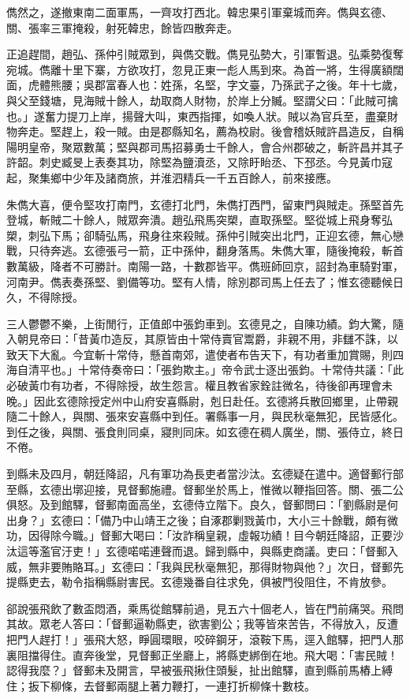 儁然之，遂撤東南二面軍馬，一齊攻打西北。韓忠果引軍棄城而奔。儁與玄德、關、張率三軍掩殺，射死韓忠，餘皆四散奔走。

正追趕間，趙弘、孫仲引賊眾到，與儁交戰。儁見弘勢大，引軍暫退。弘乘勢復奪宛城。儁離十里下寨，方欲攻打，忽見正東一彪人馬到來。為首一將，生得廣額闊面，虎體熊腰；吳郡富春人也：姓孫，名堅，字文臺，乃孫武子之後。年十七歲，與父至錢塘，見海賊十餘人，劫取商人財物，於岸上分贓。堅謂父曰：「此賊可擒也。」遂奮力提刀上岸，揚聲大叫，東西指揮，如喚人狀。賊以為官兵至，盡棄財物奔走。堅趕上，殺一賊。由是郡縣知名，薦為校尉。後會稽妖賊許昌造反，自稱陽明皇帝，聚眾數萬；堅與郡司馬招募勇士千餘人，會合州郡破之，斬許昌并其子許韶。刺史臧旻上表奏其功，除堅為鹽瀆丞，又除盱眙丞、下邳丞。今見黃巾寇起，聚集鄉中少年及諸商旅，并淮泗精兵一千五百餘人，前來接應。

朱儁大喜，便令堅攻打南門，玄德打北門，朱儁打西門，留東門與賊走。孫堅首先登城，斬賊二十餘人，賊眾奔潰。趙弘飛馬突槊，直取孫堅。堅從城上飛身奪弘槊，刺弘下馬；卻騎弘馬，飛身往來殺賊。孫仲引賊突出北門，正迎玄德，無心戀戰，只待奔逃。玄德張弓一箭，正中孫仲，翻身落馬。朱儁大軍，隨後掩殺，斬首數萬級，降者不可勝計。南陽一路，十數郡皆平。儁班師回京，詔封為車騎對軍，河南尹。儁表奏孫堅、劉備等功。堅有人情，除別郡司馬上任去了；惟玄德聽候日久，不得除授。

三人鬱鬱不樂，上街閒行，正值郎中張鈞車到。玄德見之，自陳功績。鈞大驚，隨入朝見帝曰：「昔黃巾造反，其原皆由十常侍賣官鬻爵，非親不用，非讎不誅，以致天下大亂。今宜斬十常侍，懸首南郊，遣使者布告天下，有功者重加賞賜，則四海自清平也。」十常侍奏帝曰：「張鈞欺主。」帝令武士逐出張鈞。十常侍共議：「此必破黃巾有功者，不得除授，故生怨言。權且教省家銓註微名，待後卻再理會未晚。」因此玄德除授定州中山府安喜縣尉，剋日赴任。玄德將兵散回鄉里，止帶親隨二十餘人，與關、張來安喜縣中到任。署縣事一月，與民秋毫無犯，民皆感化。到任之後，與關、張食則同桌，寢則同床。如玄德在稠人廣坐，關、張侍立，終日不倦。

到縣未及四月，朝廷降詔，凡有軍功為長吏者當沙汰。玄德疑在遣中。適督郵行部至縣，玄德出墎迎接，見督郵施禮。督郵坐於馬上，惟微以鞭指回答。關、張二公俱怒。及到館驛，督郵南面高坐，玄德侍立階下。良久，督郵問曰：「劉縣尉是何出身？」玄德曰：「備乃中山靖王之後；自涿郡剿戮黃巾，大小三十餘戰，頗有微功，因得除今職。」督郵大喝曰：「汝詐稱皇親，虛報功績！目今朝廷降詔，正要沙汰這等濫官汙吏！」玄德喏喏連聲而退。歸到縣中，與縣吏商議。吏曰：「督郵入威，無非要賄賂耳。」玄德曰：「我與民秋毫無犯，那得財物與他？」次日，督郵先提縣吏去，勒令指稱縣尉害民。玄德幾番自往求免，俱被門役阻住，不肯放參。

郤說張飛飲了數盃悶酒，乘馬從館驛前過，見五六十個老人，皆在門前痛哭。飛問其故。眾老人答曰：「督郵逼勒縣吏，欲害劉公；我等皆來苦告，不得放入，反遭把門人趕打！」張飛大怒，睜圓環眼，咬碎鋼牙，滾鞍下馬，逕入館驛，把門人那裏阻擋得住。直奔後堂，見督郵正坐廳上，將縣吏綁倒在地。飛大喝：「害民賊！認得我麼？」督郵未及開言，早被張飛揪住頭髮，扯出館驛，直到縣前馬樁上縛住；扳下柳條，去督郵兩腿上著力鞭打，一連打折柳條十數枝。

